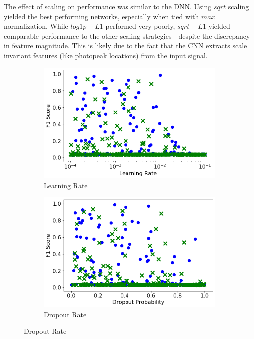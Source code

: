 The effect of scaling on performance was similar to the DNN. Using $sqrt$ scaling yielded the best performing networks, especially when tied with $max$ normalization. While $log1p-L1$ performed very poorly, $sqrt-L1$ yielded comparable performance to the other scaling strategies - despite the discrepancy in feature magnitude. This is likely due to the fact that the CNN extracts scale invariant features (like photopeak locations) from the input signal.


\begin{figure}[H]
     \centering
     \begin{subfigure}[b]{0.49\textwidth}
         \centering
         \includegraphics[width=\textwidth]{images/cnn_learning_rate.png}
         \caption{Learning Rate}
         \label{fig:cnn_learning_rate}
     \end{subfigure}
     \hfill
     \begin{subfigure}[b]{0.49\textwidth}
         \centering
         \includegraphics[width=\textwidth]{images/cnn_dropout.png}
         \caption{Dropout Rate}
         \label{fig:cnn_dropout}
     \end{subfigure}


\end{figure}
